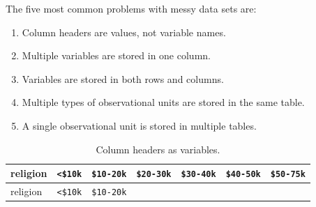 \documentclass[12pt,oneside]{reedthesis}
\providecommand{\tightlist}{%
  \setlength{\itemsep}{0pt}\setlength{\parskip}{0pt}}
\theoremstyle{definition}
\theoremstyle{definition}
\theoremstyle{definition}
\theoremstyle{remark}
\begin{document}
The five most common problems with messy data sets are:
\begin{enumerate}
\def\labelenumi{\arabic{enumi}.}
\tightlist
\item
  Column headers are values, not variable names.
\item
  Multiple variables are stored in one column.
\item
  Variables are stored in both rows and columns.
\item
  Multiple types of observational units are stored in the same table.
\item
  A single observational unit is stored in multiple tables.
\end{enumerate}
\begin{longtable}[]{@{}lllllll@{}}
\caption{Column headers as variables.}\tabularnewline
\toprule
\begin{minipage}[b]{0.16\columnwidth}\raggedright\strut
religion\strut
\end{minipage} & \begin{minipage}[b]{0.09\columnwidth}\raggedright\strut
\texttt{\textless{}\$10k}\strut
\end{minipage} & \begin{minipage}[b]{0.11\columnwidth}\raggedright\strut
\texttt{\$10-20k}\strut
\end{minipage} & \begin{minipage}[b]{0.11\columnwidth}\raggedright\strut
\texttt{\$20-30k}\strut
\end{minipage} & \begin{minipage}[b]{0.11\columnwidth}\raggedright\strut
\texttt{\$30-40k}\strut
\end{minipage} & \begin{minipage}[b]{0.11\columnwidth}\raggedright\strut
\texttt{\$40-50k}\strut
\end{minipage} & \begin{minipage}[b]{0.11\columnwidth}\raggedright\strut
\texttt{\$50-75k}\strut
\end{minipage}\tabularnewline
\midrule
\endfirsthead
\toprule
\begin{minipage}[b]{0.16\columnwidth}\raggedright\strut
religion\strut
\end{minipage} & \begin{minipage}[b]{0.09\columnwidth}\raggedright\strut
\texttt{\textless{}\$10k}\strut
\end{minipage} & \begin{minipage}[b]{0.11\columnwidth}\raggedright\strut
\texttt{\$10-20k}\strut

\end{minipage}
\end{longtable}
\end{document}
